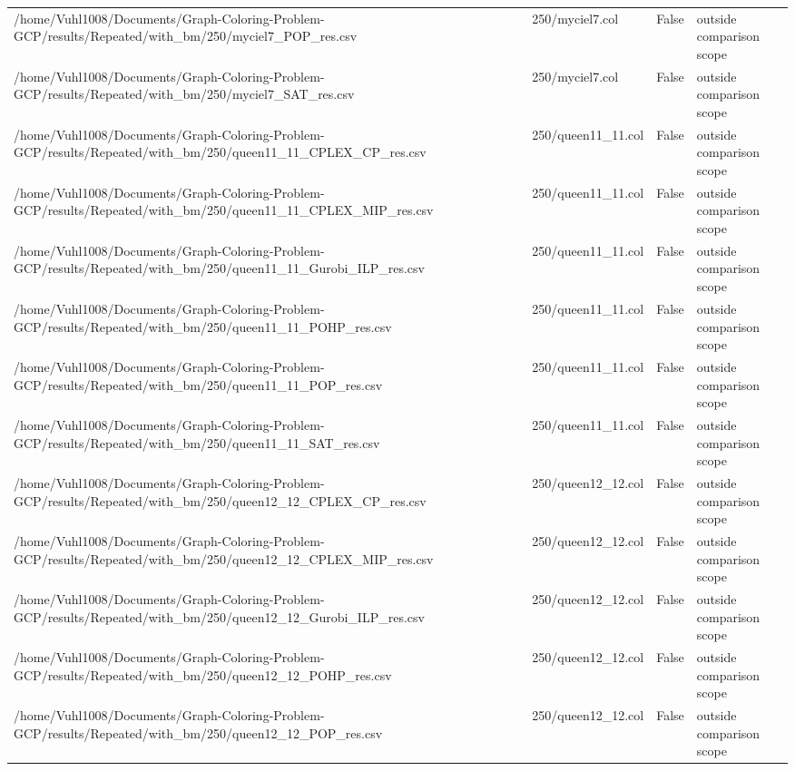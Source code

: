 \begin{table}[htbp]
\begin{tabular}{llll}
/home/Vuhl1008/Documents/Graph-Coloring-Problem-GCP/results/Repeated/with\_bm/250/myciel7\_POP\_res.csv & 250/myciel7.col & False & outside comparison scope \\
/home/Vuhl1008/Documents/Graph-Coloring-Problem-GCP/results/Repeated/with\_bm/250/myciel7\_SAT\_res.csv & 250/myciel7.col & False & outside comparison scope \\
/home/Vuhl1008/Documents/Graph-Coloring-Problem-GCP/results/Repeated/with\_bm/250/queen11\_11\_CPLEX\_CP\_res.csv & 250/queen11\_11.col & False & outside comparison scope \\
/home/Vuhl1008/Documents/Graph-Coloring-Problem-GCP/results/Repeated/with\_bm/250/queen11\_11\_CPLEX\_MIP\_res.csv & 250/queen11\_11.col & False & outside comparison scope \\
/home/Vuhl1008/Documents/Graph-Coloring-Problem-GCP/results/Repeated/with\_bm/250/queen11\_11\_Gurobi\_ILP\_res.csv & 250/queen11\_11.col & False & outside comparison scope \\
/home/Vuhl1008/Documents/Graph-Coloring-Problem-GCP/results/Repeated/with\_bm/250/queen11\_11\_POHP\_res.csv & 250/queen11\_11.col & False & outside comparison scope \\
/home/Vuhl1008/Documents/Graph-Coloring-Problem-GCP/results/Repeated/with\_bm/250/queen11\_11\_POP\_res.csv & 250/queen11\_11.col & False & outside comparison scope \\
/home/Vuhl1008/Documents/Graph-Coloring-Problem-GCP/results/Repeated/with\_bm/250/queen11\_11\_SAT\_res.csv & 250/queen11\_11.col & False & outside comparison scope \\
/home/Vuhl1008/Documents/Graph-Coloring-Problem-GCP/results/Repeated/with\_bm/250/queen12\_12\_CPLEX\_CP\_res.csv & 250/queen12\_12.col & False & outside comparison scope \\
/home/Vuhl1008/Documents/Graph-Coloring-Problem-GCP/results/Repeated/with\_bm/250/queen12\_12\_CPLEX\_MIP\_res.csv & 250/queen12\_12.col & False & outside comparison scope \\
/home/Vuhl1008/Documents/Graph-Coloring-Problem-GCP/results/Repeated/with\_bm/250/queen12\_12\_Gurobi\_ILP\_res.csv & 250/queen12\_12.col & False & outside comparison scope \\
/home/Vuhl1008/Documents/Graph-Coloring-Problem-GCP/results/Repeated/with\_bm/250/queen12\_12\_POHP\_res.csv & 250/queen12\_12.col & False & outside comparison scope \\
/home/Vuhl1008/Documents/Graph-Coloring-Problem-GCP/results/Repeated/with\_bm/250/queen12\_12\_POP\_res.csv & 250/queen12\_12.col & False & outside comparison scope \\

\end{tabular}
\end{table}
